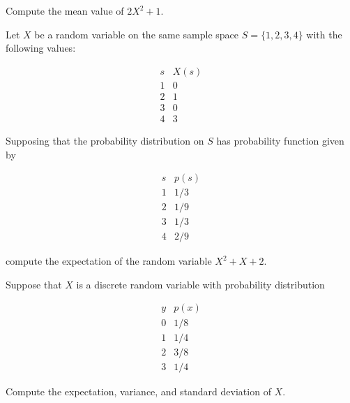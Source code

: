 \documentclass[12pt,reqno]{amsart}
\begin{document}
Compute the mean value of $2X^2+1$.\vfill















\bigskip
\prob Let $X$ be a random variable on the same sample space $S = \{1,2,3,4\}$ with the following values:

\[\begin{array}{c|c}
    s & X(s)  \\ \hline
    1 & 0  \\
    2 & 1  \\
    3 & 0 \\
    4 & 3
\end{array}\]

Supposing that the probability distribution on $S$ has probability function given by

\[\begin{array}{c|c}
    s & p(s)  \\ \hline
    1 & 1/3  \\
    2 & 1/9  \\
    3 & 1/3 \\
    4 & 2/9
\end{array}\]

compute the expectation of the random variable $X^2 + X + 2$.\vfill

















\newpage
\prob Suppose that $X$ is a discrete random variable with probability distribution

    \[\begin{array}{c|c}
        y & p(x) \\ \hline
        0 & 1/8   \\
        1 & 1/4   \\
        2 & 3/8  \\
        3 & 1/4 
    \end{array}\]

Compute the expectation, variance, and standard deviation of $X$.\vfill
\end{document}
